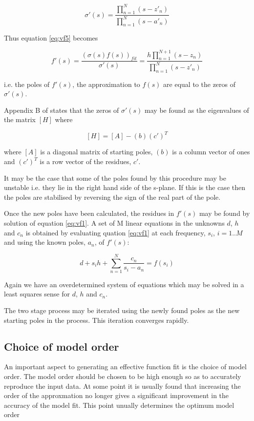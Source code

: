 \begin{equation}\label{eq:vf7}
\sigma'(s)=\frac{\prod_{n=1}^N \left( s-z'_n\right)}{\prod_{n=1}^N \left( s-a'_n\right)}
\end{equation} 

Thus equation \ref{eq:vf5} becomes


\begin{equation}\label{eq:vf8}
f'(s)=\frac{(\sigma(s)f(s))_{fit}}{\sigma'(s)}=\frac{h \prod_{n=1}^{N+1} \left( s-z_n\right)}
{\prod_{n=1}^N \left( s-z'_n\right)}
\end{equation} 

i.e. the poles of $f'(s)$, the approximation to $f(s)$ are equal to the zeros of $\sigma'(s)$.

Appendix B of \cite{vfit1} states that the zeros of $\sigma'(s)$ may be found as the eigenvalues of the matrix $[H]$ where

\begin{equation}
\left[ H \right] = \left[ A \right] - \left( b \right) \left( c' \right)^T
\end{equation}

where $\left[ A \right]$ is a diagonal matrix of starting poles, $\left( b \right)$ is a column vector of ones and $ \left( c' \right)^T$ is a row vector of the residues, $c'$.

It may be the case that some of the poles found by this procedure may be unstable i.e. they lie in the right hand side of the s-plane. If this is the case then the poles are stabilised by reversing the sign of the real part of the pole. 

Once the new poles have been calculated, the residues in $f'(s)$ may be found by solution of equation \ref{eq:vf1}. A set of M linear equations in the unknowns $d$, $h$ and  $c_n$ is obtained by evaluating quation \ref{eq:vf1} at each frequency, $s_i$, $i=1..M$ and using the known poles, $a_n$, of $f'(s)$:

\begin{equation}\label{eq:vf9}
 d+s_i h+\sum_{n=1}^N \frac{c_n}{s_i-a_n} = f(s_i)
\end{equation} 

Again we have an overdetermined system of equations which may be solved in a least squares sense for $d$, $h$ and  $c_n$.

The two stage process may be iterated using the newly found poles as the new starting poles in the process. This iteration converges rapidly.



\subsection{Choice of model order}

An important aspect to generating an effective function fit is the choice of model order. The model order should be chosen to be high enough so as to accurately reproduce the input data. At some point it is usually found that increasing the order of the approxmation no longer gives a significant improvement in the accuracy of the model fit. This point unually determines the optimum model order


